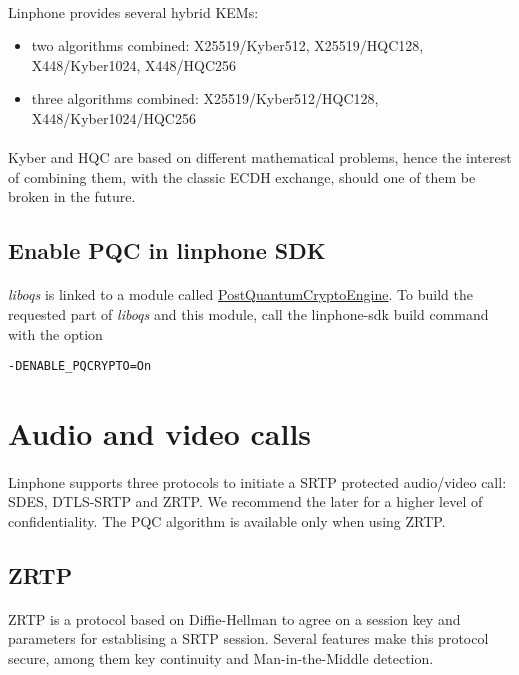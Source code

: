 \documentclass[a4paper,11pt]{article}
\begin{document}
\paragraph*{}Linphone provides several hybrid KEMs:
\begin{itemize}
  \item two algorithms combined: X25519/Kyber512, X25519/HQC128, X448/Kyber1024, X448/HQC256
  \item three algorithms combined: X25519/Kyber512/HQC128, X448/Kyber1024/HQC256
\end{itemize}
\paragraph*{}Kyber and HQC are based on different mathematical problems, hence the interest of combining them, with the classic ECDH exchange, should one of them be broken in the future.

\subsection{Enable PQC in linphone SDK}
\paragraph*{}\textit{liboqs} is linked to a module called \href{https://gitlab.linphone.org/BC/private/postquantumcryptoengine}{PostQuantumCryptoEngine}. To build the requested part of \textit{liboqs} and this module, call the linphone-sdk build command with the option
\lstset{language=bash}
\begin{lstlisting}
-DENABLE_PQCRYPTO=On
\end{lstlisting}

\newpage
\section{Audio and video calls}
\paragraph*{}Linphone supports three protocols to initiate a SRTP protected audio/video call: SDES, DTLS-SRTP and ZRTP. We recommend the later for a higher level of confidentiality. The PQC algorithm is available only when using ZRTP\citep{rfc6189}.
\subsection{ZRTP}
\paragraph*{}ZRTP is a protocol based on Diffie-Hellman to agree on a session key and parameters for establising a SRTP session. Several features make this protocol secure, among them key continuity and Man-in-the-Middle detection.
\end{document}
